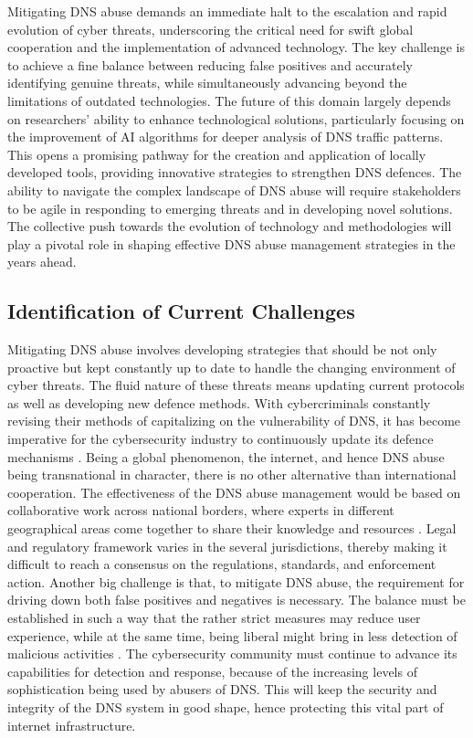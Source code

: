 Mitigating DNS abuse demands an immediate halt to the escalation and rapid evolution of cyber threats, underscoring the critical need for swift global cooperation and the implementation of advanced technology. The key challenge is to achieve a fine balance between reducing false positives and accurately identifying genuine threats, while simultaneously advancing beyond the limitations of outdated technologies. \cite{pour2023comprehensive} The future of this domain largely depends on researchers' ability to enhance technological solutions, particularly focusing on the improvement of AI algorithms for deeper analysis of DNS traffic patterns. This opens a promising pathway for the creation and application of locally developed tools, providing innovative strategies to strengthen DNS defences. The ability to navigate the complex landscape of DNS abuse will require stakeholders to be agile in responding to emerging threats and in developing novel solutions. The collective push towards the evolution of technology and methodologies will play a pivotal role in shaping effective DNS abuse management strategies in the years ahead.


\subsection{Identification of Current Challenges}

Mitigating DNS abuse involves developing strategies that should be not only proactive but kept constantly up to date to handle the changing environment of cyber threats. The fluid nature of these threats means updating current protocols as well as developing new defence methods. With cybercriminals constantly revising their methods of capitalizing on the vulnerability of DNS, it has become imperative for the cybersecurity industry to continuously update its defence mechanisms \cite{bhattacharya2023dns}. Being a global phenomenon, the internet, and hence DNS abuse being transnational in character, there is no other alternative than international cooperation. The effectiveness of the DNS abuse management would be based on collaborative work across national borders, where experts in different geographical areas come together to share their knowledge and resources \cite{altulaihan2022cybersecurity}. Legal and regulatory framework varies in the several jurisdictions, thereby making it difficult to reach a consensus on the regulations, standards, and enforcement action. Another big challenge is that, to mitigate DNS abuse, the requirement for driving down both false positives and negatives is necessary. The balance must be established in such a way that the rather strict measures may reduce user experience, while at the same time, being liberal might bring in less detection of malicious activities \cite{lyu2022survey}. The cybersecurity community must continue to advance its capabilities for detection and response, because of the increasing levels of sophistication being used by abusers of DNS. This will keep the security and integrity of the DNS system in good shape, hence protecting this vital part of internet infrastructure.

